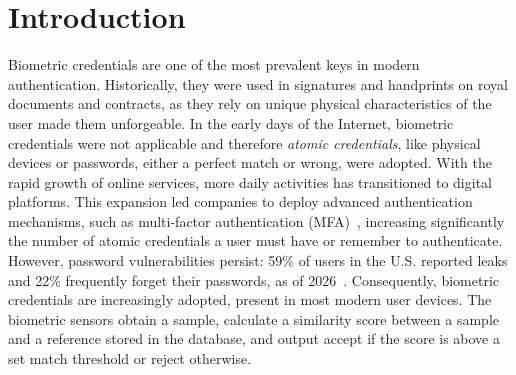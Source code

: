 \documentclass[sigconf]{acmart}
\theoremstyle{definition}
\begin{document}



\maketitle

\section{Introduction}
Biometric credentials are one of the most prevalent keys in modern authentication. Historically, they were used in signatures and handprints on royal documents and contracts, as they rely on unique physical characteristics of the user made them unforgeable. In the early days of the Internet, biometric credentials were not applicable and therefore \emph{atomic credentials}, like physical devices or passwords, either a perfect match or wrong, were adopted. With the rapid growth of online services, more daily activities has transitioned to digital platforms. This expansion led companies to deploy advanced authentication mechanisms, such as multi-factor authentication (MFA)~\cite{Abhishek2013}, increasing significantly the number of atomic credentials a user must have or remember to authenticate. However, password vulnerabilities persist: 59\% of users in the U.S. reported leaks and 22\% frequently forget their passwords, as of 2026~\cite{password_leak}. Consequently, biometric credentials are increasingly adopted, present in most modern user devices. The biometric sensors obtain a sample, calculate a similarity score between a sample and a reference stored in the database, and output accept if the score is above a set match threshold or reject otherwise.
\end{document}
